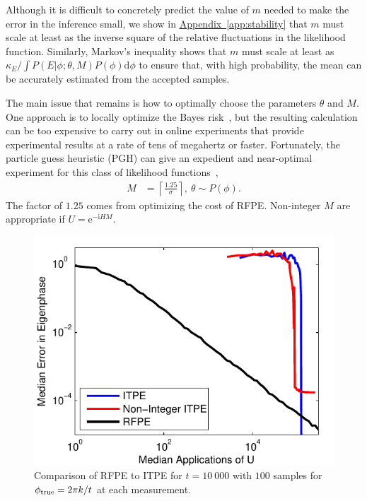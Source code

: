 \documentclass[aps,pra,amsmath,twocolumn,amssymb,superscriptaddress]{revtex4-1}
\newcommand{\app}[1]{\hyperref[app:#1]{Appendix~\ref*{app:#1}}}
\newcommand{\ii}{\mathrm{i}}
\newcommand{\ee}{\mathrm{e}}
\begin{document}
Although it is difficult to concretely predict the value of $m$ needed to make the error in the inference small, we show in \app{stability} that $m$ must scale at least as the inverse square of the relative fluctuations in the likelihood function.  Similarly, Markov's inequality shows that $m$ must scale at least as $\kappa_E/\int P(E|\phi;\theta,M)P(\phi) \mathrm{d}\phi$ to ensure that, with high probability, the mean can be accurately estimated from the accepted samples.  

The main issue that remains is how to optimally choose the parameters $\theta$
and $M$. One approach is to locally optimize the Bayes
risk~\cite{granade_robust_2012}, but the resulting calculation can be too
expensive to carry out in online experiments that provide experimental results
at a rate of tens of megahertz or faster.  Fortunately, the particle guess heuristic (PGH) can give an
expedient and
near-optimal experiment for this class of likelihood
functions~\cite{wiebe_hamiltonian_2014},
\begin{align}
    M &= \left\lceil\frac{1.25}{\sigma}\right\rceil,~
    \theta \sim P(\phi).\label{eq:PGH}
\end{align}
The factor of $1.25$ comes from optimizing the cost of RFPE.   Non-integer $M$
are appropriate if $U=\ee^{-\ii H M}$.

\begin{figure}[t!]
    \begin{centering}
        \includegraphics[width=0.723\linewidth]{ITPEcmp.pdf}
    \end{centering}
    \caption{\label{fig:ITPEcmp}
     Comparison of RFPE to ITPE for $t=10~000$ with $100$ samples for $\phi_{\rm true} = 2\pi k/t$ at each measurement.  
    }
\end{figure}
\end{document}
